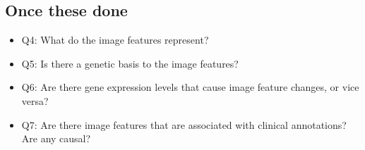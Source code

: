 \documentclass{article}
\begin{document}
\subsection*{Once these done}
\begin{itemize}
\item Q4: What do the image features represent?
\item Q5: Is there a genetic basis to the image features?
\item Q6: Are there gene expression levels that cause image feature changes, or vice versa?
\item Q7: Are there image features that are associated with clinical annotations? Are any causal?

\end{itemize}






%
%
\end{document}
